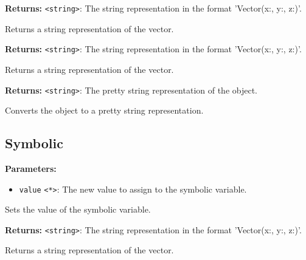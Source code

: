 \documentclass[12pt,a4paper]{article}
\begin{document}
\noindent \textbf{Returns:} \texttt{<string>}: The string representation in the format 'Vector(x:, y:, z:)'.

\noindent Returns a string representation of the vector.

\vspace{5mm}
\noindent {}


\noindent \textbf{Returns:} \texttt{<string>}: The string representation in the format 'Vector(x:, y:, z:)'.

\noindent Returns a string representation of the vector.

\vspace{5mm}
\noindent {}


\noindent \textbf{Returns:} \texttt{<string>}: The pretty string representation of the object.

\noindent Converts the object to a pretty string representation.


\subsection{Symbolic}
\vspace{5mm}
\noindent {}


\noindent \textbf{Parameters:}
\begin{itemize}
  \item \texttt{value} \texttt{<*>}: The new value to assign to the symbolic variable.
\end{itemize}

\noindent Sets the value of the symbolic variable.

\vspace{5mm}
\noindent {}


\noindent \textbf{Returns:} \texttt{<string>}: The string representation in the format 'Vector(x:, y:, z:)'.

\noindent Returns a string representation of the vector.
\end{document}
